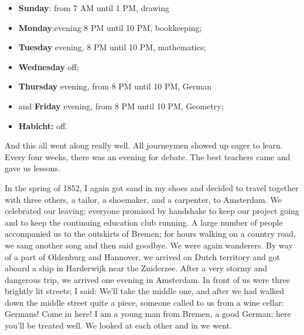 \begin{itemize}
\tightlist
\item
  \textbf{Sunday}: from 7 AM until 1 PM, drawing
\item
  \textbf{Monday}:evening 8 PM until 10 PM, bookkeeping;
\item
  \textbf{Tuesday} evening, 8 PM until 10 PM, mathematics;
\item
  \textbf{Wednesday} off;
\item
  \textbf{Thursday} evening, from 8 PM until 10 PM, German
\item
  and \textbf{Friday} evening, from 8 PM until 10 PM, Geometry;
\item
  \textbf{Habicht:} off.
\end{itemize}

And this all went along really well. All journeymen showed up eager to learn. Every four weeks, there was an evening for debate. The best teachers came and gave us lessons.

In the spring of 1852, I again got sand in my shoes and decided to travel together with three others, a tailor, a shoemaker, and a carpenter, to Amsterdam. We celebrated our leaving; everyone promised by handshake to keep our project going and to keep the continuing education club running. A large number of people accompanied us to the outskirts of Bremen; for hours walking on a country road, we sang another song and then said goodbye. We were again wanderers. By way of a part of Oldenburg and Hannover, we arrived on Dutch territory and got aboard a ship in Harderwijk near the Zuiderzee. After a very stormy and dangerous trip, we arrived one evening in Amsterdam. In front of us were three brightly lit streets; I said: We'll take the middle one, and after we had walked down the middle street quite a piece, someone called to us from a wine cellar: Germans! Come in here! I am a young man from Bremen, a good German; here you'll be treated well. We looked at each other and in we went.

